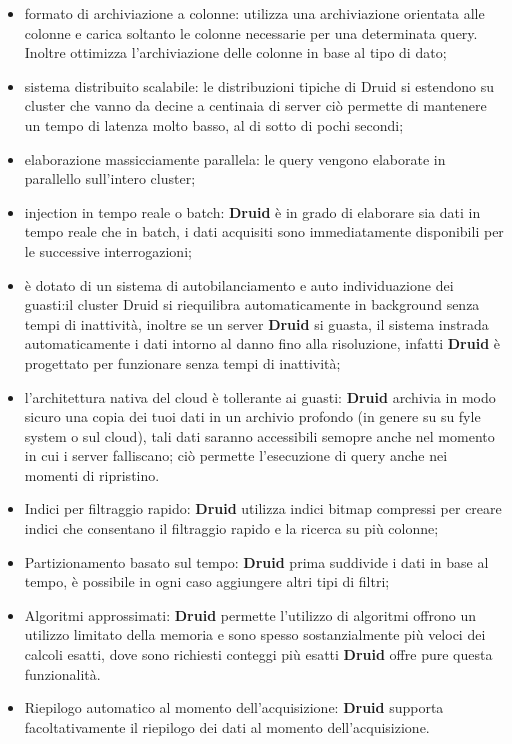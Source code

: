 \documentclass{article}
\begin{document}
\begin{itemize}
    \item formato di archiviazione a colonne: utilizza una archiviazione orientata alle colonne e carica soltanto le colonne necessarie per una determinata query. Inoltre ottimizza l'archiviazione delle colonne in base al tipo di dato;
    \item sistema distribuito scalabile: le distribuzioni tipiche di Druid si estendono su cluster che vanno da decine a centinaia di server ciò permette di mantenere un tempo di latenza molto basso, al di sotto di pochi secondi;
    \item elaborazione massicciamente parallela: le query vengono elaborate in parallello sull'intero cluster;
    \item injection in tempo reale o batch: \textbf{Druid} è in grado di elaborare sia dati in tempo reale che in batch, i dati acquisiti sono immediatamente disponibili per le successive interrogazioni;
    \item è dotato di un sistema di autobilanciamento e auto individuazione dei guasti:il cluster Druid si riequilibra automaticamente in background senza tempi di inattività, inoltre se un server \textbf{Druid} si guasta, il sistema instrada automaticamente i dati intorno al danno fino alla risoluzione, infatti \textbf{Druid} è progettato per funzionare senza tempi di inattività;
    \item l'architettura nativa del cloud è tollerante ai guasti: \textbf{Druid} archivia in modo sicuro una copia dei tuoi dati in un archivio profondo (in genere su su fyle system o sul cloud), tali dati saranno accessibili semopre anche nel momento in cui i server falliscano; ciò permette l'esecuzione di query anche nei momenti di ripristino.
    \item Indici per filtraggio rapido: \textbf{Druid} utilizza indici bitmap compressi per creare indici che consentano il filtraggio rapido e la ricerca su più colonne;
    \item Partizionamento basato sul tempo: \textbf{Druid} prima suddivide i dati in base al tempo, è possibile in ogni caso aggiungere altri tipi di filtri;
   \item  Algoritmi approssimati:
   \textbf{Druid} permette l'utilizzo di algoritmi offrono un utilizzo limitato della memoria e sono spesso sostanzialmente più veloci dei calcoli esatti, dove sono richiesti conteggi più esatti \textbf{Druid} offre pure questa funzionalità.
   \item Riepilogo automatico al momento dell'acquisizione: \textbf{Druid} supporta facoltativamente il riepilogo dei dati al momento dell'acquisizione.
\end{itemize}
\end{document}
